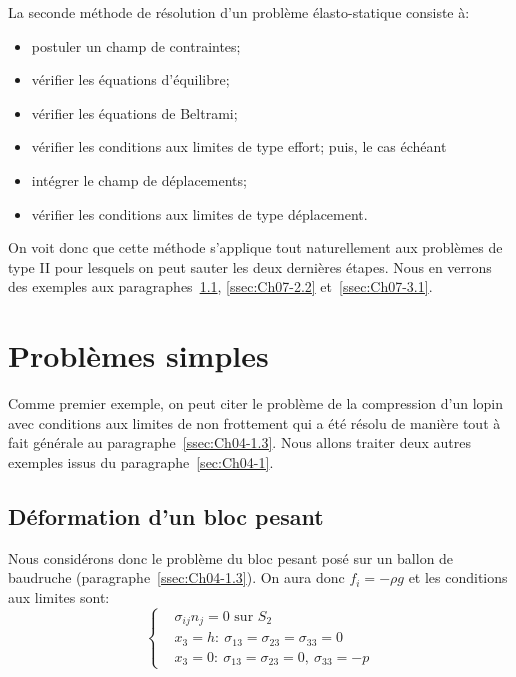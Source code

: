 La seconde méthode de résolution d'un problème élasto-statique consiste à: 
\begin{itemize}
    \item postuler un champ de contraintes;
    \item vérifier les équations d'équilibre;
    \item vérifier les équations de Beltrami;
    \item vérifier les conditions aux limites de type effort;
puis, le cas échéant 
\end{itemize}
\begin{itemize}
    \item intégrer le champ de déplacements;
    \item  vérifier les conditions aux limites de type déplacement.
\end{itemize}
On voit donc que cette méthode s'applique tout naturellement aux problèmes de type II pour lesquels on peut sauter les deux dernières étapes.
Nous en verrons des exemples aux paragraphes~\ref{ssec:Ch06-2.1}, \ref{ssec:Ch07-2.2} et~\ref{ssec:Ch07-3.1}.

\section{Problèmes simples} \label{sec:Ch06-2}
Comme premier exemple, on peut citer le problème de la compression d'un lopin avec conditions aux limites de non frottement qui a été résolu de manière tout à fait générale au paragraphe~\ref{ssec:Ch04-1.3}.
Nous allons traiter deux autres exemples issus du paragraphe~\ref{sec:Ch04-1}.
\subsection{Déformation d'un bloc pesant} \label{ssec:Ch06-2.1}
Nous considérons donc le problème du bloc pesant posé sur un ballon de baudruche (paragraphe~\ref{ssec:Ch04-1.3}).
On aura donc $f_i = -\rho g$ et les conditions aux limites sont:
\begin{equation}
    \left\{
    \begin{aligned}
        & \sigma_{ij} n_j = 0 \text{ sur } S_2 \\
        & x_3 = h:\ \sigma_{13} = \sigma_{23} = \sigma_{33} = 0 \\
        & x_3 = 0:\ \sigma_{13} = \sigma_{23} = 0, \ \sigma_{33} = -p
    \end{aligned}
    \right.
    \label{eq:Ch06-032}
\end{equation}

